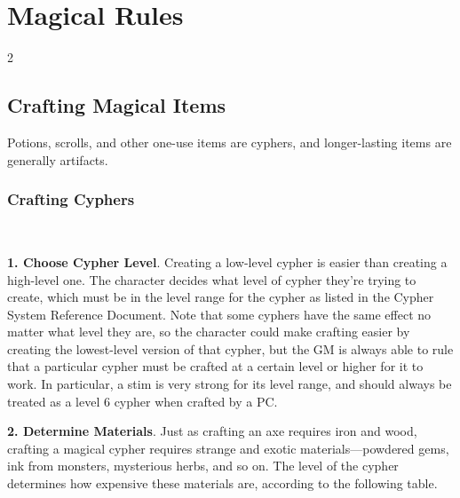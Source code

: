 \part{Magical Rules}

\begin{multicols}{2}

\chapter{Crafting Magical Items}

Potions, scrolls, and other one-use items are cyphers, and longer-lasting items are generally artifacts.

\section{Crafting Cyphers} 

\textbf{1. Choose Cypher Level}. Creating a low-level cypher is easier than creating a high-level one. The character decides what level of cypher they’re trying to create, which must be in the level range for the cypher as listed in the Cypher System Reference Document. Note that some cyphers have the same effect no matter what level they are, so the character could make crafting easier by creating the lowest-level version of that cypher, but the GM is always able to rule that a particular cypher must be crafted at a certain level or higher for it to work. In particular, a stim is very strong for its level range, and should always be treated as a level 6 cypher when crafted by a PC. 

\textbf{2. Determine Materials}. Just as crafting an axe requires iron and wood, crafting a magical cypher requires strange and exotic materials—powdered gems, ink from monsters, mysterious herbs, and so on. The level of the cypher determines how expensive these materials are, according to the following table.

\end{multicols}

